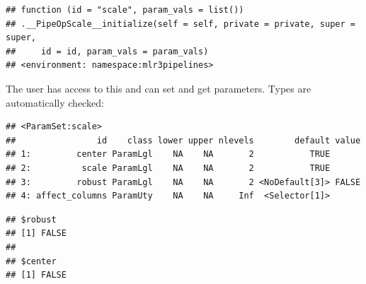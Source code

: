 \documentclass[
]{scrbook}
\newenvironment{Shaded}{\begin{snugshade}}{\end{snugshade}}
\newcommand{\CommentTok}[1]{\textcolor[rgb]{0.56,0.35,0.01}{\textit{#1}}}
\newcommand{\ConstantTok}[1]{\textcolor[rgb]{0.00,0.00,0.00}{#1}}
\newcommand{\FunctionTok}[1]{\textcolor[rgb]{0.00,0.00,0.00}{#1}}
\newcommand{\NormalTok}[1]{#1}
\newcommand{\OtherTok}[1]{\textcolor[rgb]{0.56,0.35,0.01}{#1}}
\newcommand{\SpecialCharTok}[1]{\textcolor[rgb]{0.00,0.00,0.00}{#1}}
\newcommand{\StringTok}[1]{\textcolor[rgb]{0.31,0.60,0.02}{#1}}
\renewenvironment{Shaded} {\begin{snugshade}\small} {\end{snugshade}}
\begin{document}
\begin{verbatim}
## function (id = "scale", param_vals = list()) 
## .__PipeOpScale__initialize(self = self, private = private, super = super, 
##     id = id, param_vals = param_vals)
## <environment: namespace:mlr3pipelines>
\end{verbatim}

The user has access to this and can set and get parameters.
Types are automatically checked:

\begin{Shaded}
\end{Shaded}

\begin{verbatim}
## <ParamSet:scale>
##                id    class lower upper nlevels        default value
## 1:         center ParamLgl    NA    NA       2           TRUE      
## 2:          scale ParamLgl    NA    NA       2           TRUE      
## 3:         robust ParamLgl    NA    NA       2 <NoDefault[3]> FALSE
## 4: affect_columns ParamUty    NA    NA     Inf  <Selector[1]>
\end{verbatim}

\begin{Shaded}
\end{Shaded}

\begin{verbatim}
## $robust
## [1] FALSE
## 
## $center
## [1] FALSE
\end{verbatim}

\begin{Shaded}
\end{Shaded}
\end{document}
